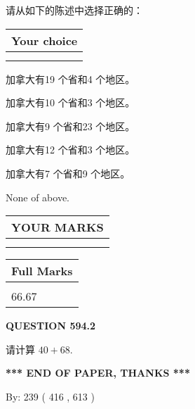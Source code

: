 \documentclass{ctexart}
\begin{document}
  
请从如下的陈述中选择正确的：
  
  
\noindent\hspace{3.0in} \begin{tabular}{|l|}
\hline
Your choice \\
\hline
 \\ 
 \\ 
\hline
\end{tabular}
  
  
 
 
加拿大有19 个省和4 个地区。
 
 
加拿大有10 个省和3 个地区。
 
 
加拿大有9 个省和23 个地区。
 
 
加拿大有12 个省和3 个地区。
 
 
加拿大有7 个省和9 个地区。
 
 
 None of above.
 
 
  
\vspace{0.2in}
  
\noindent\begin{tabular}{|l|}
\hline
 YOUR MARKS  \\
\hline
 \\ 
 \\ 
\hline
\end{tabular}
\hspace{0.05in} \begin{tabular}{|l|}
\hline
 Full Marks  \\
\hline
 \\ 
66.67 \\
\hline
\end{tabular}
{\textbf{\Large{QUESTION
594.2 
}}}
  
  
 
请计算 $ %
40 +  %
68 $.
 

 

 
   
   
 \vspace{0.2in}
 
   
   
   
   
\vspace{1.0in} 
{\textbf{\large{ *** END OF PAPER, THANKS *** }}} 
   
   
\hspace{1.0in} By: 
 239 ( 416 ,  613 )
   
\end{document}
